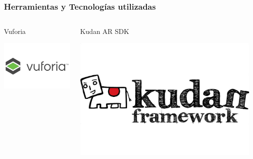 \begin{frame}
	\frametitle{Herramientas y Tecnologías utilizadas}
		\begin{columns}
			\begin{column}{0.3\textwidth}
				\begin{center}					
					Vuforia 
				\end{center}
				\vspace{3mm}
				\vfill 
					\begin{center}
						\includegraphics[width=0.8\linewidth]{Images/vuforia}
					\end{center}
			\end{column}
			\begin{column}{0.3\textwidth}
				\begin{center}
				Kudan AR SDK
				\end{center}
				\vspace{3mm}
				\vfill 
					\begin{center}
						\includegraphics[width=0.8\linewidth]{Images/kudan}
					\end{center}
			\end{column}

\end{columns}
\end{frame}
